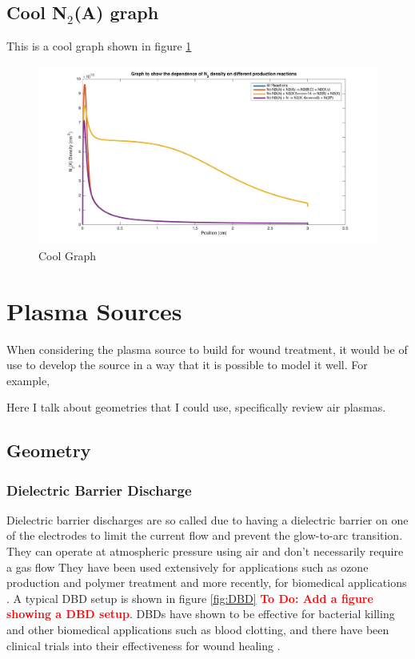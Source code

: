 \documentclass[11pt, oneside]{article}   	%
\newcommand{\todo}[1]{ \textcolor{red}{\bf{To Do:} #1}}
\begin{document}
\subsection{Cool N$_2$(A) graph}
This is a cool graph shown in figure \ref{fig:N2A}

\begin{figure}
\includegraphics[width=\textwidth]{Figures/N2Adependence}
\caption{Cool Graph}
\label{fig:N2A}
\end{figure}


\section{Plasma Sources}
When considering the plasma source to build for wound treatment, it would be of use to develop the source in a way that it is possible to model it well.
For example, 


Here I talk about geometries that I could use, specifically review air plasmas.
\subsection{Geometry}
\subsubsection{Dielectric Barrier Discharge}
Dielectric barrier discharges are so called due to having a dielectric barrier on one of the electrodes to limit the current flow and prevent the glow-to-arc transition. 
They can operate at atmospheric pressure using air and don't necessarily require a gas flow \cite{Fridman2013plasmamedicine}
They have been used extensively for applications such as ozone production and polymer treatment and more recently, for biomedical applications \cite{Fridman2013plasmamedicine, Brehmer2015alleviation}.
A typical DBD setup is shown in figure \ref{fig:DBD} \todo{Add a figure showing a DBD setup}.
DBDs have shown to be effective for bacterial killing and other biomedical applications such as blood clotting, and there have been clinical trials into their effectiveness for wound healing \cite{Daeschlein2012in, Fridman2006blood, Brehmer2015alleviation}. 
\end{document}
